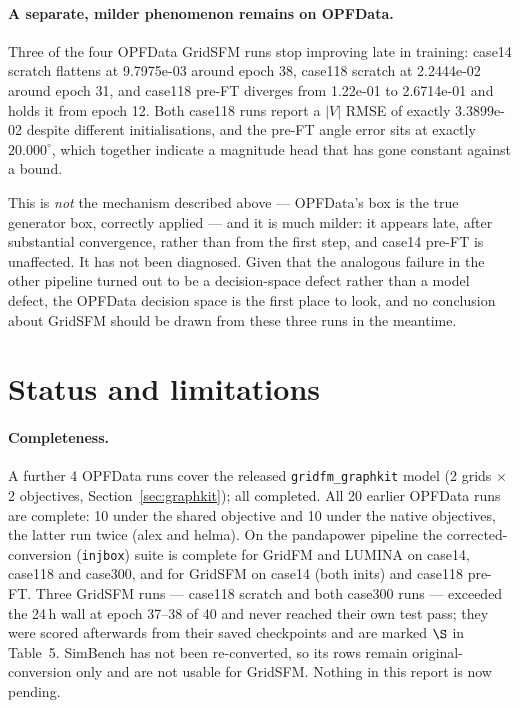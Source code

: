 \documentclass[10pt]{article}
\begin{document}
\paragraph{A separate, milder phenomenon remains on OPFData.} Three of the four
OPFData GridSFM runs stop improving late in training: case14 scratch flattens at
9.7975e-03 around epoch 38, case118 scratch at 2.2444e-02 around epoch 31, and
case118 pre-FT diverges from 1.22e-01 to 2.6714e-01 and holds it from epoch 12.
Both case118 runs report a \(|V|\) RMSE of exactly 3.3899e-02 despite different
initialisations, and the pre-FT angle error sits at exactly \(20.000^\circ\),
which together indicate a magnitude head that has gone constant against a bound.

This is \emph{not} the mechanism described above --- OPFData's box is the true
generator box, correctly applied --- and it is much milder: it appears late,
after substantial convergence, rather than from the first step, and case14 pre-FT
is unaffected. It has not been diagnosed. Given that the analogous failure in the
other pipeline turned out to be a decision-space defect rather than a model
defect, the OPFData decision space is the first place to look, and no conclusion
about GridSFM should be drawn from these three runs in the meantime.

\section{Status and limitations}

\paragraph{Completeness.} A further 4 OPFData runs cover the released
\texttt{gridfm\_graphkit} model (2 grids \(\times\) 2 objectives,
Section~\ref{sec:graphkit}); all completed. All 20 earlier OPFData runs are
complete: 10 under the shared
objective and 10 under the native objectives, the latter run twice (alex and
helma). On the pandapower pipeline the corrected-conversion (\texttt{injbox})
suite is complete for GridFM and LUMINA on case14, case118 and case300, and for
GridSFM on case14 (both inits) and case118 pre-FT. Three GridSFM runs ---
case118 scratch and both case300 runs --- exceeded the 24\,h wall at epoch
37--38 of 40 and never reached their own test pass; they were scored afterwards
from their saved checkpoints and are marked \(\S\) in Table~5. SimBench has not
been re-converted, so its rows remain original-conversion only and are not
usable for GridSFM. Nothing in this report is now pending.
\end{document}
